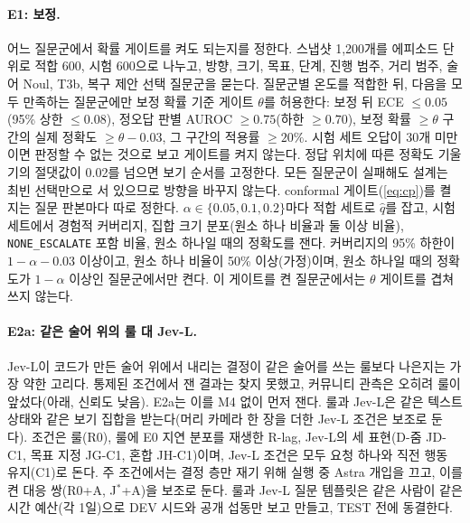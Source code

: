 \paragraph{E1: 보정.}
어느 질문군에서 확률 게이트를 켜도 되는지를 정한다. 스냅샷 1,200개를 에피소드 단위로 적합 600, 시험 600으로 나누고, 방향, 크기, 목표, 단계, 진행 범주, 거리 범주, 술어 Noul, T3b, 복구 제안 선택 질문군을 묻는다. 질문군별 온도를 적합한 뒤, 다음을 모두 만족하는 질문군에만 보정 확률 기준 게이트 $\theta$를 허용한다: 보정 뒤 ECE $\le0.05$(95\% 상한 $\le0.08$), 정오답 판별 AUROC $\ge0.75$(하한 $\ge0.70$), 보정 확률 $\ge\theta$ 구간의 실제 정확도 $\ge\theta-0.03$, 그 구간의 적용률 $\ge20\%$. 시험 세트 오답이 30개 미만이면 판정할 수 없는 것으로 보고 게이트를 켜지 않는다. 정답 위치에 따른 정확도 기울기의 절댓값이 0.02를 넘으면 보기 순서를 고정한다. 모든 질문군이 실패해도 설계는 최빈 선택만으로 서 있으므로 방향을 바꾸지 않는다.
conformal 게이트(\cref{eq:cp})를 켤지는 질문 판본마다 따로 정한다. $\alpha\in\{0.05, 0.1, 0.2\}$마다 적합 세트로 $\hat q$를 잡고, 시험 세트에서 경험적 커버리지, 집합 크기 분포(원소 하나 비율과 둘 이상 비율), \texttt{NONE\_ESCALATE} 포함 비율, 원소 하나일 때의 정확도를 잰다. 커버리지의 95\% 하한이 $1-\alpha-0.03$ 이상이고, 원소 하나 비율이 50\% 이상(가정)이며, 원소 하나일 때의 정확도가 $1-\alpha$ 이상인 질문군에서만 켠다. 이 게이트를 켠 질문군에서는 $\theta$ 게이트를 겹쳐 쓰지 않는다.

\paragraph{E2a: 같은 술어 위의 룰 대 Jev-L.}
Jev-L이 코드가 만든 술어 위에서 내리는 결정이 같은 술어를 쓰는 룰보다 나은지는 가장 약한 고리다. 통제된 조건에서 잰 결과는 찾지 못했고, 커뮤니티 관측은 오히려 룰이 앞섰다(아래, 신뢰도 낮음). E2a는 이를 M4 없이 먼저 잰다. 룰과 Jev-L은 같은 텍스트 상태와 같은 보기 집합을 받는다(머리 카메라 한 장을 더한 Jev-L 조건은 보조로 둔다). 조건은 룰(R0), 룰에 E0 지연 분포를 재생한 R-lag, Jev-L의 세 표현(D-줌 JD-C1, 목표 지정 JG-C1, 혼합 JH-C1)이며, Jev-L 조건은 모두 요청 하나와 직전 행동 유지(C1)로 돈다. 주 조건에서는 결정 층만 재기 위해 실행 중 Astra 개입을 끄고, 이를 켠 대응 쌍(R0+A, J$^*$+A)을 보조로 둔다. 룰과 Jev-L 질문 템플릿은 같은 사람이 같은 시간 예산(각 1일)으로 DEV 시드와 공개 섭동만 보고 만들고, TEST 전에 동결한다.

